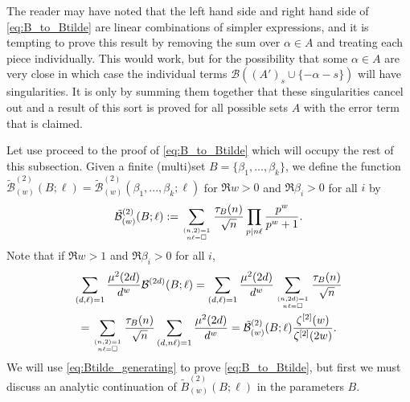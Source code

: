 \documentclass[12pt]{amsart}
\begin{document}
	The reader may have noted that the left hand side and right hand side of \eqref{eq:B_to_Btilde} are linear combinations of simpler expressions, and it is tempting to prove this result by removing the sum over $\alpha \in A$ and treating each piece individually. This would work, but for the possibility that some $\alpha \in A$ are very close in which case the individual terms $\mathcal{B}((A')_s \cup \{-\alpha-s\})$ will have singularities. It is only by summing them together that these singularities cancel out and a result of this sort is proved for all possible sets $A$ with the error term that is claimed.
	
	Let use proceed to the proof of \eqref{eq:B_to_Btilde} which will occupy the rest of this subsection. Given a finite (multi)set $B = \{\beta_1,...,\beta_k\}$, we define the function $\tilde{\mathcal{B}}^{(2)}_{(w)}(B;\ell) = \tilde{\mathcal{B}}^{(2)}_{(w)}(\beta_1,...,\beta_k;\ell)$ for $\Re w > 0$ and $\Re \beta_i > 0$ for all $i$ by
	$$
	\tilde{\mathcal{B}}^{(2)}_{(w)}(B;\ell):= \sum_{(n,2)=1 \atop n\ell = \square} \frac{\tau_B(n)}{\sqrt{n}} \prod_{p | n\ell} \frac{p^w}{p^w+1}.
	$$
	Note that if $\Re w > 1$ and $\Re \beta_i > 0$ for all $i$,
	\begin{multline}
		\label{eq:Btilde_generating}
		\sum_{(d,\ell)=1} \frac{\mu^2(2d)}{d^w} \mathcal{B}^{(2d)}(B;\ell) = \sum_{(d,\ell)=1} \frac{\mu^2(2d)}{d^w} \sum_{(n,2d)=1 \atop n\ell = \square} \frac{\tau_B(n)}{\sqrt{n}} \\
		= \sum_{(n,2)=1 \atop n\ell = \square} \frac{\tau_B(n)}{\sqrt{n}} \sum_{(d,n\ell)=1} \frac{\mu^2(2d)}{d^w} = \tilde{\mathcal{B}}^{(2)}_{(w)}(B;\ell) \frac{\zeta^{[2]}(w)}{\zeta^{[2]}(2w)}.
	\end{multline}
	We will use \eqref{eq:Btilde_generating} to prove \eqref{eq:B_to_Btilde}, but first we must discuss an analytic continuation of $\tilde{B}^{(2)}_{(w)}(B;\ell)$ in the parameters $B$.
	
\end{document}
